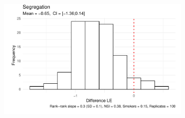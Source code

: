 \begin{figure}[htp]
\begin{subfigure}[b]{0.60\textwidth}
         \centering
         \includegraphics[width=\textwidth]{plots/microsimulation/microsimulation_3.pdf}
     \end{subfigure} %
\end{figure}
